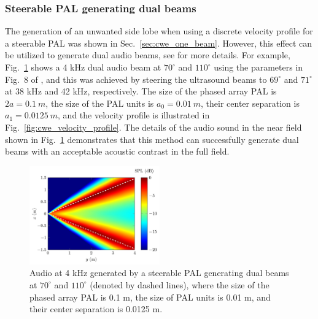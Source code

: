 \subsubsection{Steerable PAL generating dual beams}
The generation of an unwanted side lobe when using a discrete velocity profile for a steerable PAL was shown in Sec.~\ref{sec:cwe_one_beam}. 
However, this effect can be utilized to generate dual audio beams, see \cite{Shi2011GratingLobeElimination} for more details. 
For example, Fig.~\ref{fig:cwe_results_dual_beam_2d} shows a 4 kHz dual audio beam at $70^\circ$ and $110^\circ$ using the parameters in Fig.~8 of \cite{Shi2015ConvolutionModelComputing}, and this was achieved by steering the ultrasound beams to $69^\circ$ and $71^\circ$ at 38 kHz and 42 kHz, respectively. 
The size of the phased array PAL is $2a = \SI{0.1}{m}$, the size of the PAL units is $a_0 = \SI{0.01}{m}$, their center separation is $a_1 = \SI{0.0125}{m}$, and the velocity profile is illustrated in Fig.~\ref{fig:cwe_velocity_profile}. 
The details of the audio sound in the near field shown in Fig.~\ref{fig:cwe_results_dual_beam_2d} demonstrates that this method can successfully generate dual beams with an acceptable acoustic contrast in the full field.

\begin{figure}[!htb]
    \centering
    \includegraphics[width = 0.5\textwidth]{fig/Shi2015JasaFig8_FullField_v3_resize.jpg}
    \caption{Audio  at 4 kHz generated by a steerable PAL generating dual beams at \ensuremath{70^\circ} and \ensuremath{110^\circ} (denoted by dashed lines), where the size of the phased array PAL is 0.1 m, the size of PAL units is 0.01 m, and their center separation is 0.0125 m.}
    \label{fig:cwe_results_dual_beam_2d}
\end{figure}

